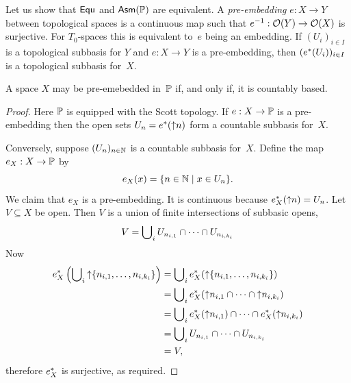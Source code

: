 Let us show that $\mathsf{Equ}$ and $\mathsf{Asm}(\mathbb{P})$ are equivalent. A
\emph{pre-embedding} $e : X \to Y$ between topological spaces is a
continuous map such that ${e}^{-1} : \mathcal{O}(Y) \to \mathcal{O}(X)$ is
surjective. For $T_0$-spaces this is equivalent to~$e$ being an
embedding. If $(U_i)_{i \in I}$ is a topological subbasis for $Y$ and
$e : X \to Y$ is a pre-embedding, then $(e^{*}(U_i))_{i \in I}$ is
a topological subbasis for~$X$.

\begin{theorem}
  \label{thm:scott-embedding}%
  A space $X$ may be pre-emebedded in~$\mathbb{P}$ if, and only if, it is
  countably based.
\end{theorem}

\begin{proof}
  Here $\mathbb{P}$ is equipped with the Scott topology. If $e : X \to
  \mathbb{P}$ is a pre-embedding then the open sets $U_n =
  e^{*}({\uparrow}n)$ form a countable subbasis for~$X$.

  Conversely, suppose $(U_n)_{n \in \mathbb{N}}$ is a countable subbasis
  for~$X$. Define the map $e_X : X \to \mathbb{P}$ by
  \begin{equation*}
    e_X(x) = \{n \in \mathbb{N} \mid x \in U_n\}.
  \end{equation*}
  We claim that $e_X$ is a pre-embedding. It is continuous because
  $e_X^{*}({\uparrow}n) = U_n$. Let $V \subseteq X$ be open. Then 
  $V$ is a union of finite intersections of subbasic opens,
  \begin{equation*}
    V = \bigcup\nolimits_i U_{n_{i,1}} \cap \cdots \cap U_{n_{i,k_i}}
  \end{equation*}
  Now
  \begin{align*}
    e_X^{*}\left(\bigcup\nolimits_i {\uparrow}\{n_{i,1}, \ldots, n_{i,k_i}\}\right) &=
      \bigcup\nolimits_i e_X^{*}({\uparrow}\{n_{i,1}, \ldots, n_{i,k_i}\})
      \\
      &=
      \bigcup\nolimits_i e_X^{*}({\uparrow}n_{i,1} \cap \cdots \cap {\uparrow}n_{i,k_i})
      \\
      &=
      \bigcup\nolimits_i e_X^{*}({\uparrow}n_{i,1}) \cap \cdots \cap e_X^{*}({\uparrow}n_{i,k_i})
      \\
      &=
      \bigcup\nolimits_i U_{n_{i,1}} \cap \cdots \cap U_{n_{i,k_i}} \\
      &= V,
  \end{align*}
  therefore $e_X^{*}$ is surjective, as required.
\end{proof}

